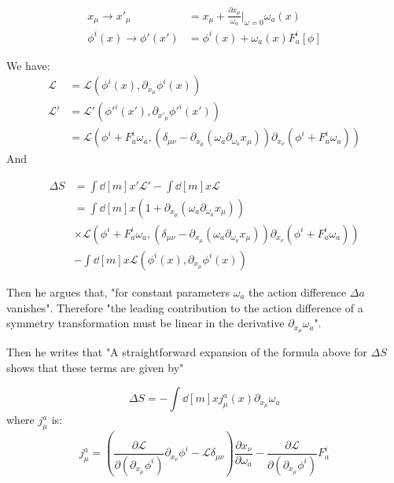 \documentclass{article}
\begin{document}
\begin{align}
    x_\mu \to x'_\mu &= x_\mu + \frac{\partial x_\mu}{\omega_a}|_{\omega=0} \omega_a(x) \\
    \phi^i(x) \to \phi'(x') &= \phi^i(x) + \omega_a(x)F^i_a[\phi]
\end{align}

We have:
\begin{align}
    \mathcal{L} &= \mathcal{L}(\phi^i(x),\partial_{x_\mu}\phi^i(x)) \\
    \mathcal{L}' &= \mathcal{L'}(\phi'^i(x'),\partial_{x'_\mu}\phi'^i(x')) \\
    &= \mathcal{L}\left(\phi^i+F^i_a\omega_a, 
                    \left(\delta_{\mu\nu}-\partial_{x_\mu}(\omega_a
                    \partial_{\omega_a}x_\mu)\right)
                    \partial_{x_\nu}(\phi^i+F^i_a\omega_a)
                  \right)
\end{align}
And 

\begin{align}
    \Delta S &= \int \dd[m]{x'} \mathcal{L}' - \int \dd[m]{x} \mathcal{L} 
    \label{eq:dS-integrand}\\
    &=
    \int \dd[m]{x}
    \left(1+\partial_{x_\mu}\left(\omega_a \partial_{\omega_a}x_\mu\right) \right) 
    \nonumber\\
    &\times \mathcal{L}\left(
                    \phi^i+F^i_a\omega_a, 
                    \left(\delta_{\mu\nu}-\partial_{x_\mu}\left(\omega_a
                        \partial_{\omega_a}x_\mu\right)\right)
                        \partial_{x_\nu}(\phi^i+F^i_a\omega_a)
                    \right) \nonumber\\
    &- \int \dd[m]{x}  \mathcal{L}(\phi^i(x),\partial_{x_\mu}\phi^i(x))
\end{align}

Then he argues that, "for constant parameters $\omega_a$ the action difference
$\Delta a$ vanishes". Therefore "the leading contribution to the action
difference of a symmetry transformation must be linear in the derivative
$\partial_{x_\mu}\omega_a$".

Then he writes that "A straightforward expansion of the formula above
for $\Delta S$ shows that these terms are given by"

\begin{equation}
    \Delta S = -\int \dd[m]{x} j^a_\mu (x) \partial_{x_\mu}\omega_a
\end{equation}
where $j^a_\mu$ is:
\begin{equation}
    j^a_\mu = \left(
        \frac{\partial \mathcal{L}}{\partial(\partial_{x_\mu}\phi^i)}
            \partial_{x_\nu}\phi^i
        -\mathcal{L}\delta_{\mu\nu} \right) \frac{\partial x_\nu}{\partial\omega_a}
    - \frac{\partial\mathcal{L}}{\partial(\partial_{x_\mu}\phi^i)} F^i_a
\end{equation}
\end{document}
